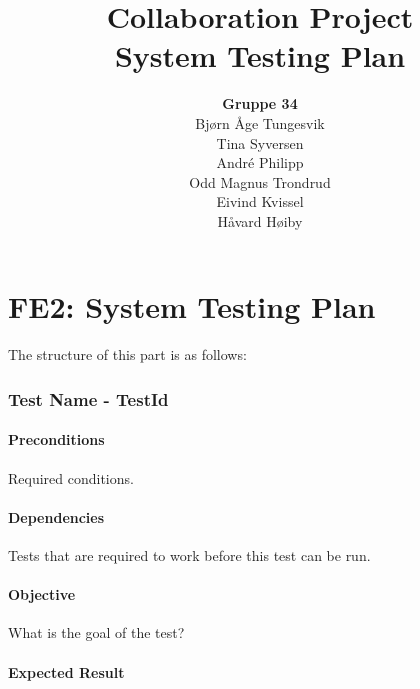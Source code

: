 \documentclass{article}
\begin{document}
\begin{titlepage}
\title{Collaboration Project\\
\textbf{System Testing Plan}}
\author{\textbf{Gruppe 34}\\
Bj\o rn \AA ge Tungesvik\\
Tina Syversen\\
Andr\'e Philipp\\
Odd Magnus Trondrud
\\Eivind Kvissel\\
H\aa vard H\o iby}
\maketitle
\end{titlepage}

\part{FE2: System Testing Plan}

The structure of this part is as follows:

\section{Test Name - TestId}

\subsection{Preconditions}

Required conditions.

\subsection{Dependencies}

Tests that are required to work before this test can be run.

\subsection{Objective}

What is the goal of the test?

\subsection{Expected Result}
\end{document}
